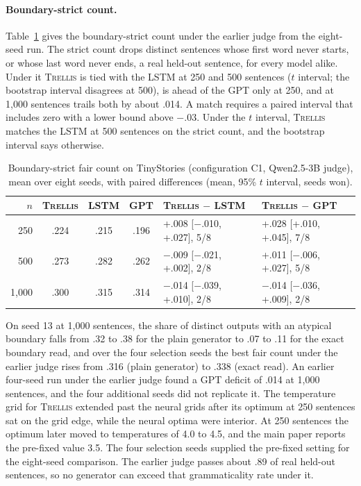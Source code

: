 \documentclass[11pt,letterpaper]{article}
\newcommand{\trellis}{\textsc{Trellis}}
\begin{document}
\paragraph{Boundary-strict count.} Table~\ref{tab:strict} gives the boundary-strict count under the earlier judge from the eight-seed run. The strict count drops distinct sentences whose first word never starts, or whose last word never ends, a real held-out sentence, for every model alike.
Under it \trellis{} is tied with the LSTM at 250 and 500 sentences ($t$ interval; the bootstrap interval disagrees at 500), is ahead of the GPT only at 250, and at 1,000 sentences trails both by about .014.
A match requires a paired interval that includes zero with a lower bound above $-.03$. Under the $t$ interval, \trellis{} matches the LSTM at 500 sentences on the strict count, and the bootstrap interval says otherwise.

\begin{table}[h]
\caption{Boundary-strict fair count on TinyStories (configuration C1, Qwen2.5-3B judge), mean over eight seeds, with paired differences (mean, 95\% $t$ interval, seeds won).}
\label{tab:strict}
\begin{center}
\footnotesize
\begin{tabular}{rcccll}
\toprule
$n$ & \trellis{} & LSTM & GPT & \trellis{} $-$ LSTM & \trellis{} $-$ GPT \\
\midrule
250   & .224 & .215 & .196 & +.008 [$-$.010, +.027], 5/8 & +.028 [+.010, +.045], 7/8 \\
500   & .273 & .282 & .262 & $-$.009 [$-$.021, +.002], 2/8 & +.011 [$-$.006, +.027], 5/8 \\
1,000 & .300 & .315 & .314 & $-$.014 [$-$.039, +.010], 2/8 & $-$.014 [$-$.036, +.009], 2/8 \\
\bottomrule
\end{tabular}
\end{center}
\end{table}

On seed 13 at 1,000 sentences, the share of distinct outputs with an atypical boundary falls from .32 to .38 for the plain generator to .07 to .11 for the exact boundary read, and over the four selection seeds the best fair count under the earlier judge rises from .316 (plain generator) to .338 (exact read).
An earlier four-seed run under the earlier judge found a GPT deficit of .014 at 1,000 sentences, and the four additional seeds did not replicate it.
The temperature grid for \trellis{} extended past the neural grids after its optimum at 250 sentences sat on the grid edge, while the neural optima were interior. At 250 sentences the optimum later moved to temperatures of 4.0 to 4.5, and the main paper reports the pre-fixed value 3.5.
The four selection seeds supplied the pre-fixed setting for the eight-seed comparison.
The earlier judge passes about .89 of real held-out sentences, so no generator can exceed that grammaticality rate under it.
\end{document}
